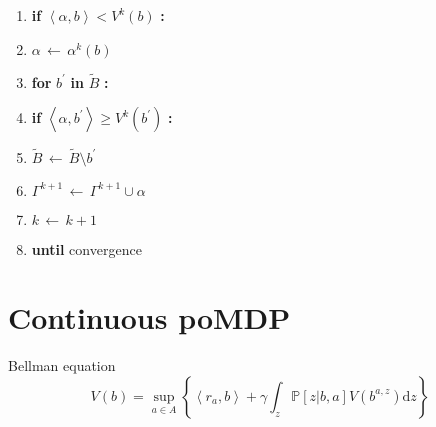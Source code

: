 \documentclass[a4paper,onecolumn]{article}
\begin{document}
\begin{enumerate}
	\item \hspace{2cm} \textbf{if} $\left<\alpha,b\right> < V^k(b)$
	\textbf{:}
	\item \hspace{3cm} $\alpha \,\leftarrow\,\alpha^k(b)$
	\item \hspace{2cm} \textbf{for} $b^\prime$ \textbf{in} $\tilde{B}$
	\textbf{:}
	\item \hspace{3cm} \textbf{if} $\left<\alpha,b^\prime\right>\ge
	V^k(b^\prime)$ \textbf{:}
	\item \hspace{4cm} $\tilde{B}\,\leftarrow\,\tilde{B}\setminus
	b^\prime$
	\item \hspace{2cm} $\Gamma^{k+1}\,\leftarrow\,\Gamma^{k+1}\cup \alpha$
	\item \hspace{1cm} $k\,\leftarrow\,k+1$
	\item \textbf{until} convergence

\end{enumerate}

\section{Continuous poMDP}
Bellman equation
\begin{equation}
    V(b) = \sup_{a\in A}\left\{
	\left<r_a, b\right> + \gamma
	\int_z \mathbb{P}[z\big|b,a]V\left(b^{a,z}\right) \textrm{d}z
	\right\}
\end{equation}
\end{document}
